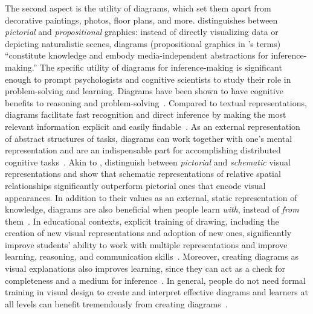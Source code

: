 The second aspect is the utility of diagrams, which set them apart from decorative paintings, photos, floor plans, and more. \citet{designWithDiagrams} distinguishes between \emph{pictorial} and \emph{propositional} graphics: instead of directly visualizing data or depicting naturalistic scenes, diagrams (propositional graphics in \citeauthor{designWithDiagrams}'s terms) ``constitute knowledge and embody media-independent abstractions for inference-making.'' The specific utility of diagrams for inference-making is significant enough to prompt psychologists and cognitive scientists to study their role in problem-solving and learning. Diagrams have been shown to have cognitive benefits to reasoning and problem-solving~\cite{whyDiagramWorth, koedinger_emergent_1992, mayer_multimedia_2002}. Compared to textual representations, diagrams facilitate fast recognition and direct inference by making the most relevant information explicit and easily findable~\cite{whyDiagramWorth}. As an external representation of abstract structures of tasks, diagrams can work together with one's mental representation and are an indispensable part for accomplishing distributed cognitive tasks~\cite{DistributedCognitive}. Akin to \citet{designingWithDiagrams}, \citet{hegarty_types_1999} distinguish between \emph{pictorial} and \emph{schematic} visual representations and show that schematic representations of relative spatial relationships significantly outperform pictorial ones that encode visual appearances. In addition to their values as an external, static representation of knowledge, diagrams are also beneficial when people learn \emph{with}, instead of \emph{from} them~\cite{tippett_what_2016}. In educational contexts, explicit training of drawing, including the creation of new visual representations and adoption of new ones, significantly improve students' ability to work with multiple representations and improve learning, reasoning, and communication skills~\cite{ainsworth_drawing_2011}. Moreover, creating diagrams as visual explanations also improves learning, since they can act as a check for completeness and a medium for inference~\cite{bobek_creating_2016}. In general, people do not need formal training in visual design to create and interpret effective diagrams and learners at all levels can benefit tremendously from creating diagrams~\cite{ABC}.

